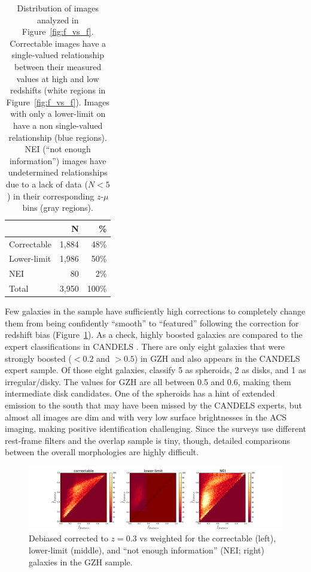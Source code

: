 \documentclass[twocolumn]{aastex6}
\begin{document}
\begin{table}
\center
\caption{Distribution of \ferengi{} images analyzed in Figure~\ref{fig:f_vs_f}.
Correctable images have a single-valued relationship between their measured
\ffeatures{} values at high and low redshifts (white regions in
Figure~\ref{fig:f_vs_f}). Images with only a lower-limit on \ffeatures{} have a
non single-valued relationship (blue regions). NEI (``not enough information'')
images have undetermined relationships due to a lack of data ($N<5$) in their
corresponding $z$-$\mu$ bins (gray regions).\label{tbl:ferengi_corrections}}
\begin{tabular}{lrr}
\hline \hline
				                   & N       & \% \\
\hline 
Correctable                        & 1,884   & 48\% \\
Lower-limit                        & 1,986   & 50\% \\
NEI                                & 80      &  2\%\\
Total                              & 3,950   & 100\% \\
\hline \hline
\end{tabular}
\end{table}

Few galaxies in the sample have sufficiently high corrections to completely
change them from being confidently ``smooth'' to ``featured'' following the
correction for redshift bias (Figure~\ref{fig:debiased_corrections}). As a
check, highly boosted galaxies are compared to the expert classifications in
CANDELS \citep{kar15}.  There are only eight galaxies that were strongly
boosted (\ffeatures$<0.2$ and \fbest$>0.5$) in GZH and also appears in the
CANDELS expert sample. Of those eight galaxies, \citet{kar15} classify 5 as
spheroids, 2 as disks, and 1 as irregular/disky. The \fbest{} values for GZH
are all between 0.5 and 0.6, making them intermediate disk candidates. One of
the spheroids has a hint of extended emission to the south that may have been
missed by the CANDELS experts, but almost all images are dim and with very low
surface brightnesses in the ACS imaging, making positive identification
challenging. Since the surveys use different rest-frame filters and the overlap
sample is tiny, though, detailed comparisons between the overall morphologies
are highly difficult.

\begin{figure}
\center
\includegraphics[width=\textwidth]{figures/debiased_corrections.pdf}
\caption{Debiased \ffeatures{} corrected to $z=0.3$ vs weighted \ffeatures{}
for the correctable (left), lower-limit (middle), and ``not enough
information'' (NEI; right) galaxies in the GZH sample.}
\label{fig:debiased_corrections}
\end{figure}
\end{document}
